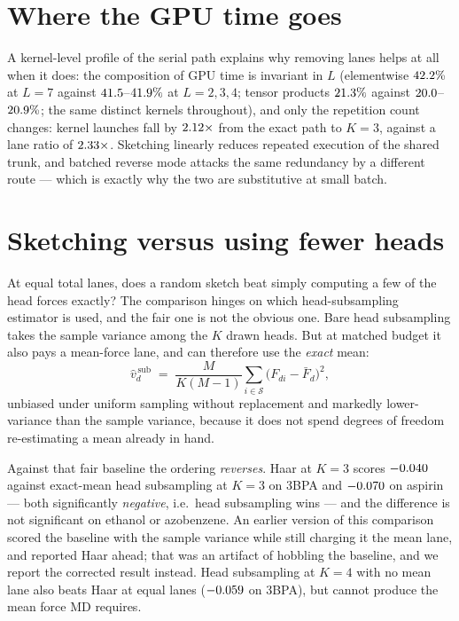 \documentclass{article}
\begin{document}
\section{Where the GPU time goes}
\label{app:kernels}
A kernel-level profile of the serial path explains why removing lanes helps at all when it does: the
composition of GPU time is invariant in $L$ (elementwise $42.2\%$ at $L{=}7$ against
$41.5$--$41.9\%$ at $L{=}2,3,4$; tensor products
$21.3\%$ against $20.0$--$20.9\%$; the same \fsKernDistinct{}
distinct kernels throughout), and only the repetition count changes: kernel launches fall by
$2.12\times$ from the exact path to $K{=}3$, against a lane ratio of
$2.33\times$. Sketching linearly reduces repeated execution of the shared trunk, and
batched reverse mode attacks the same redundancy by a different route --- which is exactly why the
two are substitutive at small batch.

\section{Sketching versus using fewer heads}
\label{app:headsub}
At equal total lanes, does a random sketch beat simply computing a few of the head forces exactly?
The comparison hinges on which head-subsampling estimator is used, and the fair one is not the
obvious one. Bare head subsampling takes the sample variance among the $K$ drawn heads. But at
matched budget it also pays a mean-force lane, and can therefore use the \emph{exact} mean:
\begin{equation*}
\widehat v^{\,\text{sub}}_d \;=\; \frac{M}{K(M-1)}\sum_{i\in\mathcal S}\bigl(F_{di}-\bar F_d\bigr)^2 ,
\end{equation*}
unbiased under uniform sampling without replacement and markedly lower-variance than the sample
variance, because it does not spend degrees of freedom re-estimating a mean already in hand.

Against that fair baseline the ordering \emph{reverses}. Haar at $K{=}3$ scores
$-0.040$ \fsDeltaVsHeadSubCI{} against exact-mean head subsampling at $K{=}3$ on 3BPA and
$-0.070$ \fsDeltaVsHeadSubAspirinCI{} on aspirin --- both significantly
\emph{negative}, i.e.\ head subsampling wins --- and the difference is not significant on ethanol or
azobenzene. An earlier version of this comparison scored the baseline with the sample variance while
still charging it the mean lane, and reported Haar ahead; that was an artifact of hobbling the
baseline, and we report the corrected result instead. Head subsampling at $K{=}4$ with no mean lane
also beats Haar at equal lanes ($-0.059$
\fsDeltaVsHeadSubNoMeanThreeBPACI{} on 3BPA), but cannot produce the mean force MD requires.
\end{document}
